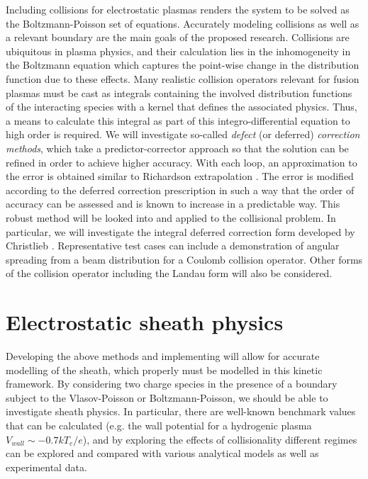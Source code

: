 \documentclass[11pt,titlepage]{report}
\begin{document}
\indent\indent Including collisions for electrostatic plasmas renders the system to be solved as the Boltzmann-Poisson set of equations. Accurately modeling collisions as well as a relevant boundary are the main goals of the proposed research. Collisions are ubiquitous in plasma physics, and their calculation lies in the inhomogeneity in the Boltzmann equation which captures the point-wise change in the distribution function due to these effects. Many realistic collision operators relevant for fusion plasmas must be cast as integrals containing the involved distribution functions of the interacting species with a kernel that defines the associated physics. Thus, a means to calculate this integral as part of this integro-differential equation to high order is required. We will investigate so-called \emph{defect} (or deferred) \emph{correction methods}, which take a predictor-corrector approach so that the solution can be refined in order to achieve higher accuracy. With each loop, an approximation to the error is obtained similar to Richardson extrapolation \cite{Christlieb09_2}. The error is modified according to the deferred correction prescription in such a way that the order of accuracy can be assessed and is known to increase in a predictable way. This robust method will be looked into and applied to the collisional problem. In particular, we will investigate the integral deferred correction form developed by Christlieb \cite{Christlieb09_2}. Representative test cases can include a demonstration of angular spreading from a beam distribution for a Coulomb collision operator. Other forms of the collision operator including the Landau form will also be considered.

\section{Electrostatic sheath physics}

\indent\indent Developing the above methods and implementing will allow for accurate modelling of the sheath, which properly must be modelled in this kinetic framework. By considering two charge species in the presence of a boundary subject to the Vlasov-Poisson or Boltzmann-Poisson, we should be able to investigate sheath physics. In particular, there are well-known benchmark values that can be calculated (e.g. the wall potential for a hydrogenic plasma $V_{wall} \sim -0.7 kT_e / e$), and by exploring the effects of collisionality different regimes can be explored and compared with various analytical models as well as experimental data.
\end{document}
